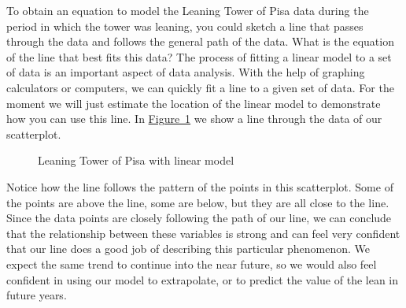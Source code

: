 \documentclass[10pt,]{book}
\theoremstyle{ptxdefinitionnotitle}
\theoremstyle{ptxdefinitiontitle}
\numberwithin{equation}{section}
\begin{document}
\par
\hypertarget{p-94}{}%
To obtain an equation to model the Leaning Tower of Pisa data during the period in which the tower was leaning, you could sketch a line that passes through the data and follows the general path of the data. What is the equation of the line that best fits this data? The process of fitting a linear model to a set of data is an important aspect of data analysis. With the help of graphing calculators or computers, we can quickly fit a line to a given set of data. For the moment we will just estimate the location of the linear model to demonstrate how you can use this line. In \hyperref[tower-of-pisa-linear-model]{Figure~1} we show a line through the data of our scatterplot.%
\begin{figure}
\centering
{
}
\caption{Leaning Tower of Pisa with linear model\label{tower-of-pisa-linear-model}}
\end{figure}
\hypertarget{p-95}{}%
Notice how the line follows the pattern of the points in this scatterplot. Some of the points are above the line, some are below, but they are all close to the line. Since the data points are closely following the path of our line, we can conclude that the relationship between these variables is strong and can feel very confident that our line does a good job of describing this particular phenomenon. We expect the same trend to continue into the near future, so we would also feel confident in using our model to extrapolate, or to predict the value of the lean in future years.%
\end{document}
